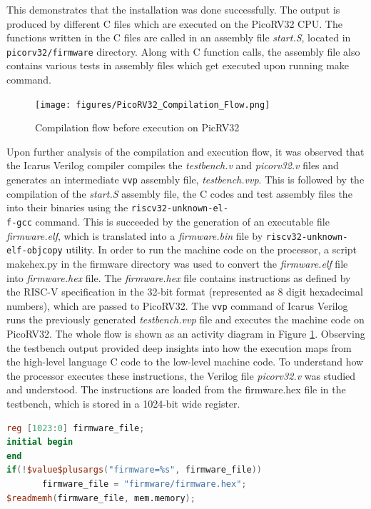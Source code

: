 This demonstrates that the installation was done successfully. The output is produced by different C files which are executed on the PicoRV32 CPU. The functions written in the C files are called in an assembly file \textit{start.S}, located in \verb|picorv32/firmware| directory. Along with C function calls, the assembly file also contains various tests in assembly files which get executed upon running make command. \newline
\begin{figure}[h!]
\centering
\texttt{[image: figures/PicoRV32\_Compilation\_Flow.png]}
\caption{Compilation flow before execution on PicRV32}
\label{fig:riscv5}
\end{figure}

Upon further analysis of the compilation and execution flow, it was observed that the Icarus Verilog compiler compiles the \textit{testbench.v} and \textit{picorv32.v} files and generates an intermediate \verb|vvp| assembly file, \textit{testbench.vvp}. This is followed by the compilation of the \textit{start.S} assembly file, the C codes and test assembly files the into their binaries using the \verb|riscv32-unknown-el-| \\ \verb|f-gcc| command. This is succeeded by the generation of an executable file \textit{firmware.elf}, which is translated into a \textit{firmware.bin} file by \verb|riscv32-unknown-| \\ \verb|elf-objcopy| utility. In order to run the machine code on the processor, a script makehex.py in the firmware directory was used to convert the \textit{firmware.elf} file into \textit{firmware.hex} file. The \textit{firmware.hex} file contains instructions as defined by the RISC-V specification in the 32-bit format (represented as 8 digit hexadecimal numbers), which are passed to PicoRV32. The \verb|vvp| command of Icarus Verilog runs the previously generated \textit{testbench.vvp} file and executes the machine code on PicoRV32. The whole flow is shown as an activity diagram in Figure \ref{fig:riscv5}.\newline\newline
Observing the testbench output provided deep insights into how the execution maps from the high-level language C code to the low-level machine code. To understand how the processor executes these instructions, the Verilog file \textit{picorv32.v} was studied and understood. The instructions are loaded from the firmware.hex file in the testbench, which is stored in a 1024-bit wide register.
\begin{lstlisting}[language=Verilog]
reg [1023:0] firmware_file;
initial begin
end
if(!$value$plusargs("firmware=%s", firmware_file))
       firmware_file = "firmware/firmware.hex";
$readmemh(firmware_file, mem.memory);
\end{lstlisting}

